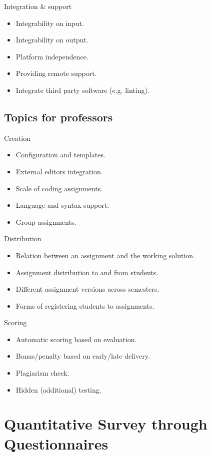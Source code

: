 {Integration \& support}

\begin{itemize}
\item
  {Integrability on input.}
\item
  {Integrability on output.}
\item
  {Platform independence.}
\item
  {Providing remote support.}
\item
  {Integrate third party software (e.g. linting).}
\end{itemize}

\subsection{Topics for professors} \label{ssec:prof}

{Creation}

\begin{itemize}
\item
  {Configuration and templates.}
\item
  {External editors integration.}
\item
  {Scale of coding assignments.}
\item
  {Language and syntax support.}
\item
  {Group assignments.}
\end{itemize}

{Distribution}

\begin{itemize}
\item
  {Relation between an assignment and the working solution.}
\item
  {Assignment distribution to and from students.}
\item
  {Different assignment versions across semesters.}
\item
  {Forms of registering students to assignments.}
\end{itemize}

{Scoring}

\begin{itemize}
\item
  {Automatic scoring based on evaluation.}
\item
  {Bonus/penalty based on early/late delivery.}
\item
  {Plagiarism check.}
\item
  {Hidden (additional) testing.}
\end{itemize}

\section{Quantitative Survey through Questionnaires} \label{sec:quantitative}

